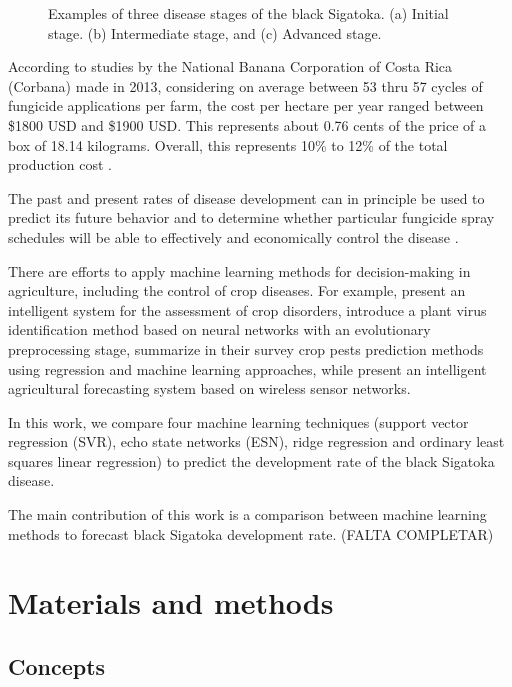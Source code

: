 \documentclass[review]{elsarticle}
\begin{document}
\begin{figure}[h]
\begin{subfigure}{.3\textwidth}
  \caption{}
  \label{fig:sfig3}
\end{subfigure}
\caption{Examples of three disease stages of the black Sigatoka. (a) Initial stage. (b) Intermediate stage, and (c) Advanced stage.} 
\label{figura1} 
\end{figure}

According to studies by the National Banana Corporation of Costa Rica
(Corbana) made in 2013, considering on average between 53 thru 57
cycles of fungicide applications per farm, the cost per hectare per
year ranged between \$1800 USD and \$1900 USD. This represents
about 0.76 cents of the price of a box of 18.14 kilograms. Overall,
this represents 10\% to 12\% of the total production cost
\citet{Bresciani2015}.

The past and present rates of disease development  can in principle be used
to predict its future behavior and to determine whether
particular fungicide spray schedules will be able to effectively and
economically control the disease \citet{ChuangJeger1987}.

There are efforts to apply machine learning methods for
decision-making in agriculture, including the control of crop
diseases. For example, \cite{Camargo2012} present an intelligent
system for the assessment of crop disorders, \cite{Huang2010}
introduce a plant virus identification method based on neural networks
with an evolutionary preprocessing stage, \cite{Kim2014} summarize in
their survey crop pests prediction methods using regression and
machine learning approaches, while \cite{Zhao2013} present an
intelligent agricultural forecasting system based on wireless sensor
networks.

In this work, we compare four machine learning techniques (support vector
regression (SVR), echo state networks (ESN), ridge regression and
ordinary least squares linear regression) to predict the development rate of the black Sigatoka disease.

The main contribution of this work is a comparison between machine
learning methods to forecast black Sigatoka development rate. (FALTA COMPLETAR)


\section{Materials and methods}

\subsection{Concepts}
\end{document}
